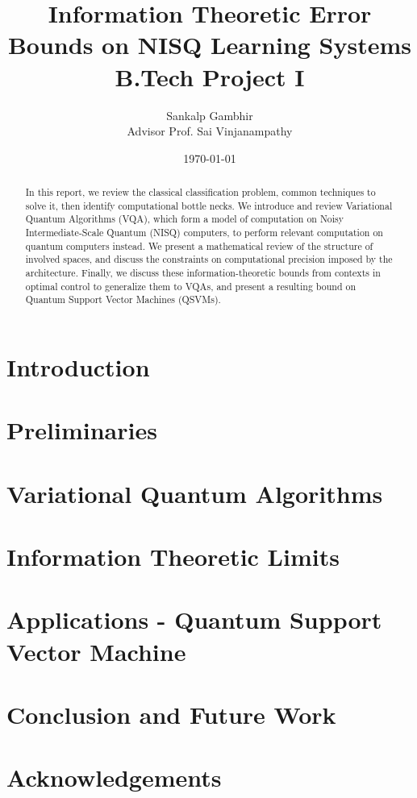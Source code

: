 \documentclass[
    paper=a4, 
    lang=en, 
    font=kpfonts,
    ptsize=12pt,
    titles=bf,
    hanging-titles=true,
    final
]
{skrapport}
\title{
    {\huge Information Theoretic Error Bounds on NISQ Learning Systems} \\
    {\large B.Tech Project I}
    }
\author[sgambhir@iitb.ac.in]{
    Sankalp Gambhir \\ 
    \vspace{1em}
        {
            \normalsize 
            \hspace{0.1em} 
            Advisor \hspace{0.5em}
            Prof. Sai Vinjanampathy
        }
    \vspace{-1.3em}
}
\date{\today}
\begin{document}
    \begin{titlepage}
        \maketitle
        \begin{abstract}
            In this report, we review the classical classification problem,
            common techniques to solve it, then identify computational bottle
            necks. We introduce and review Variational Quantum Algorithms (VQA),
            which form a model of computation on Noisy Intermediate-Scale
            Quantum (NISQ) computers, to perform relevant computation on quantum
            computers instead. We present a mathematical review of the structure
            of involved spaces, and discuss the constraints on computational
            precision imposed by the architecture. Finally, we discuss these
            information-theoretic bounds from contexts in optimal control to
            generalize them to VQAs, and present a resulting bound on Quantum
            Support Vector Machines (QSVMs).
        \end{abstract}
    \end{titlepage}

    \tableofcontents \pagebreak

    \section{Introduction}
        \label{sec:intro}
        
    
    \section{Preliminaries}
        \label{sec:prelim}
        

    \section{Variational Quantum Algorithms}
        \label{sec:vqa}
        
    
    \section{Information Theoretic Limits}
        \label{sec:infolimits}
        

    \section{Applications - Quantum Support Vector Machine}
        \label{sec:qsvm}
        

    \section{Conclusion and Future Work}
        \label{sec:future}
        

    \section*{Acknowledgements}
        \label{sec:ack}
        

    \printbibliography
\end{document}
